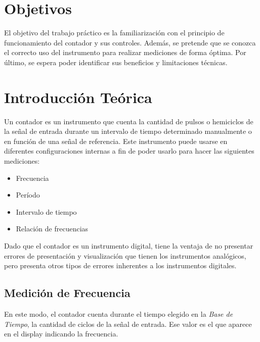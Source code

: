 \documentclass{article}
\begin{document}
\section{Objetivos}

	El objetivo del trabajo práctico es la familiarización con el principio de funcionamiento del contador y sus controles. Además, se pretende que se conozca el correcto uso del instrumento para realizar mediciones de forma óptima. Por último, se espera poder identificar sus beneficios y limitaciones técnicas.
\bigskip\bigskip




\section{Introducción Teórica}
	
	Un contador es un instrumento que cuenta la cantidad de pulsos o hemiciclos de la señal de entrada durante un intervalo de tiempo determinado manualmente o en función de una señal de referencia. Este instrumento puede usarse en diferentes configuraciones internas a fin de poder usarlo para hacer las siguientes mediciones:


\begin{itemize}
	\itemsep=3pt \topsep=0pt \partopsep=0pt \parskip=0pt \parsep=0pt
	
	\item Frecuencia
	\item Período
	\item Intervalo de tiempo
	\item Relación de frecuencias
\end{itemize}

	Dado que el contador es un instrumento digital, tiene la ventaja de no presentar errores de presentación y visualización que tienen los instrumentos analógicos, pero presenta otros tipos de errores inherentes a los instrumentos digitales.
\bigskip\bigskip



\subsection{Medición de Frecuencia}

	En este modo, el contador cuenta durante el tiempo elegido en la \textit{Base de Tiempo}, la cantidad de ciclos de la señal de entrada. Ese valor es el que aparece en el display indicando la frecuencia.
\bigskip\bigskip
\end{document}
